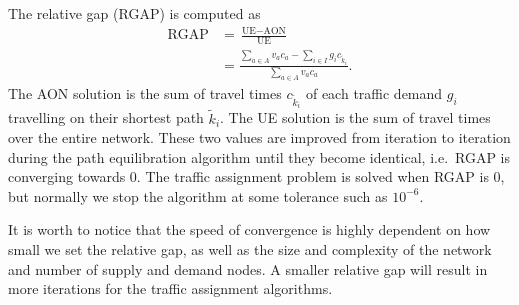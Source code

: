 The relative gap (RGAP) is computed as
\begin{align}
    \text{RGAP} &= \frac{\text{UE} - \text{AON}}{\text{UE}} \\
                &= \frac{\sum_{a \in A} v_a c_a - \sum_{i \in I} g_i c_{\tilde{k}_i}}{\sum_{a \in A} v_a c_a}.
\end{align}
The AON solution is the sum of travel times $c_{\tilde{k}_i}$ of each traffic demand $g_i$ travelling on their shortest path $\tilde{k}_i$.
The UE solution is the sum of travel times over the entire network.
These two values are improved from iteration to iteration during the path equilibration algorithm until they become identical, i.e.\ RGAP is converging towards 0.
The traffic assignment problem is solved when RGAP is 0,
but normally we stop the algorithm at some tolerance such as $10^{-6}$.

It is worth to notice that the speed of convergence is highly dependent on how small we set the relative gap,
as well as the size and complexity of the network and number of supply and demand nodes.
A smaller relative gap will result in more iterations for the traffic assignment algorithms.
